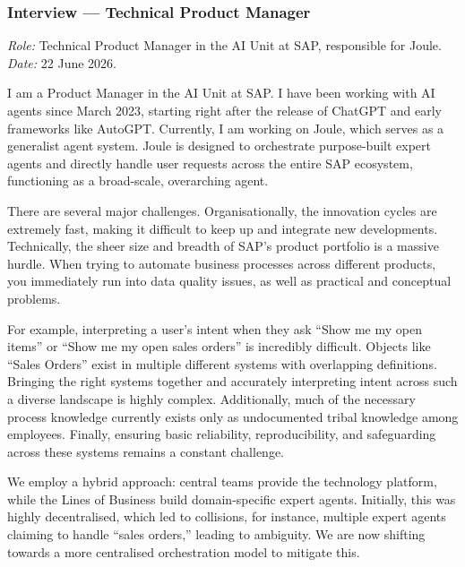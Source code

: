 \subsubsection{Interview --- Technical Product Manager}

\noindent\textit{Role:} Technical Product Manager in the AI Unit at SAP, responsible for Joule. \textit{Date:} 22 June 2026.

\medskip{}

I am a Product Manager in the AI Unit at SAP. I have been working with AI agents since March 2023, starting right after the release of ChatGPT and early frameworks like AutoGPT. Currently, I am working on Joule, which serves as a generalist agent system. Joule is designed to orchestrate purpose-built expert agents and directly handle user requests across the entire SAP ecosystem, functioning as a broad-scale, overarching agent.

\medskip{}

There are several major challenges. Organisationally, the innovation cycles are extremely fast, making it difficult to keep up and integrate new developments. Technically, the sheer size and breadth of SAP's product portfolio is a massive hurdle. When trying to automate business processes across different products, you immediately run into data quality issues, as well as practical and conceptual problems.

For example, interpreting a user's intent when they ask ``Show me my open items'' or ``Show me my open sales orders'' is incredibly difficult. Objects like ``Sales Orders'' exist in multiple different systems with overlapping definitions. Bringing the right systems together and accurately interpreting intent across such a diverse landscape is highly complex. Additionally, much of the necessary process knowledge currently exists only as undocumented tribal knowledge among employees. Finally, ensuring basic reliability, reproducibility, and safeguarding across these systems remains a constant challenge.

\medskip{}

We employ a hybrid approach: central teams provide the technology platform, while the Lines of Business build domain-specific expert agents. Initially, this was highly decentralised, which led to collisions, for instance, multiple expert agents claiming to handle ``sales orders,'' leading to ambiguity. We are now shifting towards a more centralised orchestration model to mitigate this.

